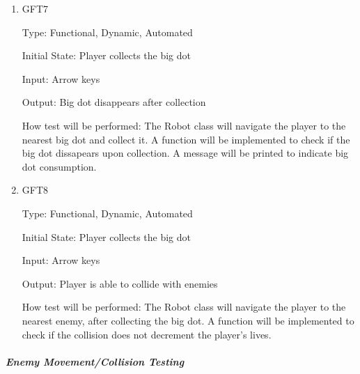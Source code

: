\documentclass[12pt, titlepage]{article}
\begin{document}
\begin{enumerate}
\item{GFT7\\}

Type: Functional, Dynamic, Automated
					
Initial State: Player collects the big dot
					
Input: Arrow keys
					
Output: Big dot disappears after collection

How test will be performed: The Robot class will navigate the player to the nearest big dot and collect it. A function will be implemented to check if the big dot dissapears upon collection. A message will be printed to indicate big dot consumption.

\item{GFT8\\}

Type: Functional, Dynamic, Automated
					
Initial State: Player collects the big dot
					
Input: Arrow keys
					
Output: Player is able to collide with enemies

How test will be performed: The Robot class will navigate the player to the nearest enemy, after collecting the big dot. A function will be implemented to check if the collision does not decrement the player's lives.

\end{enumerate}

\subparagraph{Enemy Movement/Collision Testing}
\end{document}
